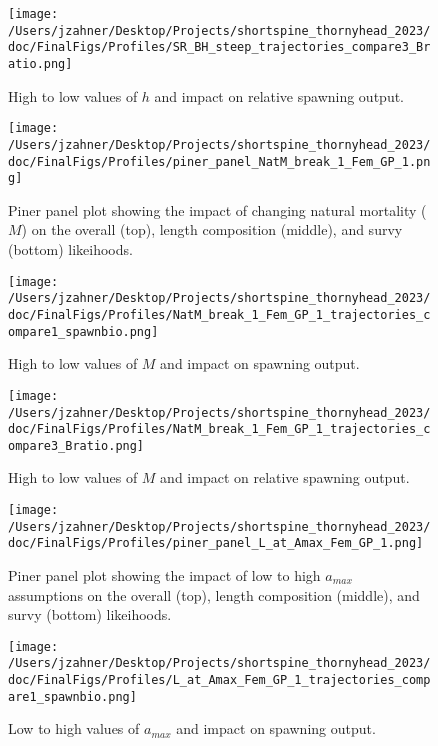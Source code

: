 \documentclass[11pt,
  english,
  letterpaper,
]{article}
\begin{document}
\begin{figure}
\centering
\texttt{[image: /Users/jzahner/Desktop/Projects/shortspine\_thornyhead\_2023/doc/FinalFigs/Profiles/SR\_BH\_steep\_trajectories\_compare3\_Bratio.png]}
\caption{High to low values of \(h\) and impact on relative spawning output.\label{fig:h_spawnout}}
\end{figure}

\begin{figure}
\centering
\texttt{[image: /Users/jzahner/Desktop/Projects/shortspine\_thornyhead\_2023/doc/FinalFigs/Profiles/piner\_panel\_NatM\_break\_1\_Fem\_GP\_1.png]}
\caption{Piner panel plot showing the impact of changing natural mortality (\(M\)) on the overall (top), length composition (middle), and survy (bottom) likeihoods.\label{fig:M_prof}}
\end{figure}

\begin{figure}
\centering
\texttt{[image: /Users/jzahner/Desktop/Projects/shortspine\_thornyhead\_2023/doc/FinalFigs/Profiles/NatM\_break\_1\_Fem\_GP\_1\_trajectories\_compare1\_spawnbio.png]}
\caption{High to low values of \(M\) and impact on spawning output.\label{fig:M_spawnout}}
\end{figure}

\begin{figure}
\centering
\texttt{[image: /Users/jzahner/Desktop/Projects/shortspine\_thornyhead\_2023/doc/FinalFigs/Profiles/NatM\_break\_1\_Fem\_GP\_1\_trajectories\_compare3\_Bratio.png]}
\caption{High to low values of \(M\) and impact on relative spawning output.\label{fig:M_relspawnout}}
\end{figure}

\begin{figure}
\centering
\texttt{[image: /Users/jzahner/Desktop/Projects/shortspine\_thornyhead\_2023/doc/FinalFigs/Profiles/piner\_panel\_L\_at\_Amax\_Fem\_GP\_1.png]}
\caption{Piner panel plot showing the impact of low to high \(a_{max}\) assumptions on the overall (top), length composition (middle), and survy (bottom) likeihoods.\label{fig:growth_prof}}
\end{figure}

\begin{figure}
\centering
\texttt{[image: /Users/jzahner/Desktop/Projects/shortspine\_thornyhead\_2023/doc/FinalFigs/Profiles/L\_at\_Amax\_Fem\_GP\_1\_trajectories\_compare1\_spawnbio.png]}
\caption{Low to high values of \(a_{max}\) and impact on spawning output.\label{fig:growth_spawnout}}
\end{figure}
\end{document}
